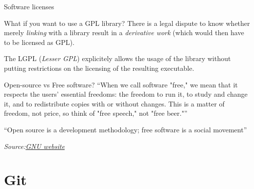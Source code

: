 \documentclass[compress]{beamer}
\newcommand{\source}[2]{{\begin{flushright}\small\it Source:\href{#1}{#2}\end{flushright}}}
\begin{document}
\begin{frame}{Software licenses}
    \centering



\end{frame}

\begin{frame}{What if you want to use a GPL library?}
    There is a legal dispute to know whether merely \emph{linking} with a
    library result in a \emph{derivative work} (which would then have to be
    licensed as GPL).

    \pause

    The LGPL (\emph{Lesser GPL}) explicitely allows the usage of the library
    without putting restrictions on the licensing of the resulting executable.

\end{frame}

\begin{frame}{}

    \begin{exampleblock}{Open-source vs Free software?}
    ``When we call software "free," we mean that it respects the users' essential
    freedoms: the freedom to run it, to study and change it, and to redistribute
    copies with or without changes. This is a matter of freedom, not price, so
    think of "free speech," not "free beer."''

        \vspace{1em}
    ``Open source is a development methodology; free software is a social
        movement''

    \end{exampleblock}

    \source{https://www.gnu.org/philosophy/open-source-misses-the-point.en.html}{GNU
    website}
\end{frame}


\section{Git}

\end{document}
